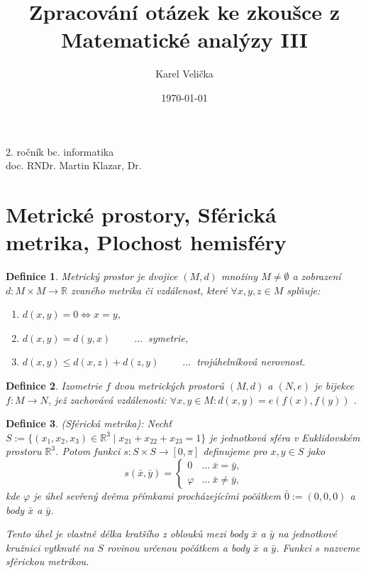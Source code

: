 \documentclass[10pt,a4paper]{article}
\title{Zpracování otázek ke zkoušce z Matematické analýzy III}
\date{\today}
\author{Karel Velička}
\newcommand{\R}{{\mathbb{R}}}       %
\newtheorem{Def}{Definice}[section]
\begin{document}
\maketitle

\begin{center}
    2. ročník bc. informatika\\ doc. RNDr. Martin Klazar, Dr.
\end{center}

\tableofcontents
\newpage



\section{Metrické prostory, Sférická metrika, Plochost hemisféry}

\begin{Def}Metrický prostor \normalfont
	je dvojice $ (M, d) $ množiny $M \neq \emptyset$ a zobrazení $ d : M \times M \to \R $ zvaného \textit{metrika} či \textit{vzdálenost}, které $\forall x, y, z \in M$ splňuje:
	\begin{enumerate}[label=(\arabic*)]
		\item $d(x, y) = 0 \iff x = y$,
		\item $d(x, y) = d(y, x)$  $\qquad \ldots~$ symetrie,
		\item $d(x, y) \leq d(x, z) + d(z, y)$   $\qquad \ldots~$ trojúhelníková nerovnost.
	\end{enumerate}
\end{Def}

\begin{Def}
	Izometrie \normalfont $ f $ dvou metrických prostorů $ (M, d) $ a $ (N, e) $ je bijekce $f : M \to N$, jež zachovává vzdálenosti: $\forall x, y \in M : d(x, y) = e(f (x), f (y))$ .
\end{Def}

\begin{Def} (Sférická metrika): \normalfont
	Nechť $	S := \{(x_1, x_2, x_3) \in \R^3 \mid x_{21} + x_{22} + x_{23} = 1 \}$ je jednotková sféra v Euklidovském prostoru $\R^3$. Potom funkci $s : S \times S \to [0, \pi]$ definujeme pro $x, y \in S$ jako \[s(\bar{x}, \bar{y})=
	\begin{cases}
		0 & \ldots  ~\bar{x}=\bar{y},\\
		\varphi & \ldots ~\bar{x}\neq\bar{y},
	\end{cases}
	\]
	kde $ \varphi $ je úhel sevřený dvěma přímkami procházejícími počátkem $\bar{0} := (0, 0, 0)$ a body $\bar{x}$ a $ \bar{y} $. 
	
	Tento úhel je vlastně délka kratšího z oblouků mezi body $ \bar{x} $ a $ \bar{y} $ na jednotkové kružnici vytknuté na $ S $
	rovinou určenou počátkem a body $ \bar{x} $ a $ \bar{y} $. 
	Funkci $ s $ nazveme \textit{sférickou metrikou}.
\end{Def}
\end{document}
